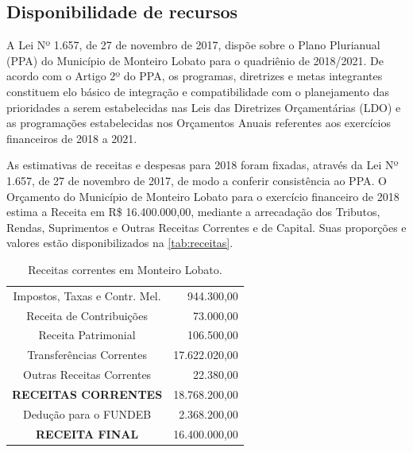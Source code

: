 \subsection{Disponibilidade de recursos}

A Lei Nº 1.657, de 27 de novembro de 2017, dispõe sobre o Plano Plurianual (PPA) do Município de Monteiro Lobato para o quadriênio de 2018/2021. De acordo com o Artigo 2º do PPA, os programas, diretrizes e metas integrantes constituem elo básico de integração e compatibilidade com o planejamento das prioridades a serem estabelecidas nas Leis das Diretrizes Orçamentárias (LDO) e as programações estabelecidas nos Orçamentos Anuais referentes aos exercícios financeiros de 2018 a 2021.

As estimativas de receitas e despesas para 2018 foram fixadas, através da Lei Nº 1.657, de 27 de novembro de 2017, de modo a conferir consistência ao PPA. O Orçamento do Município de Monteiro Lobato para o exercício financeiro de 2018 estima a Receita em R\$ 16.400.000,00, mediante a arrecadação dos Tributos, Rendas, Suprimentos e Outras Receitas Correntes e de Capital. Suas proporções e valores estão disponibilizados na \autoref{tab:receitas}. 

\begin{table}[htbp]
	\centering
	\caption{Receitas correntes em Monteiro Lobato.}
	\begin{tabular}{c|r}
		\rowcolor[rgb]{ .984,  .831,  .706} Impostos, Taxas e Contr. Mel. & 944.300,00 \\
		\rowcolor[rgb]{ .992,  .914,  .851} Receita de Contribuições & 73.000,00 \\
		\rowcolor[rgb]{ .984,  .831,  .706} Receita Patrimonial & 106.500,00 \\
		\rowcolor[rgb]{ .992,  .914,  .851} Transferências Correntes & 17.622.020,00 \\
		\rowcolor[rgb]{ .984,  .831,  .706} Outras Receitas Correntes & 22.380,00 \\
		\rowcolor[rgb]{ .992,  .914,  .851} \textbf{RECEITAS CORRENTES} & 18.768.200,00 \\
		\rowcolor[rgb]{ .984,  .831,  .706} Dedução para o FUNDEB & 2.368.200,00 \\
		\rowcolor[rgb]{ .992,  .914,  .851} \textbf{RECEITA FINAL} & 16.400.000,00 \\
	\end{tabular}%
	\label{tab:receitas}%
\end{table}%


